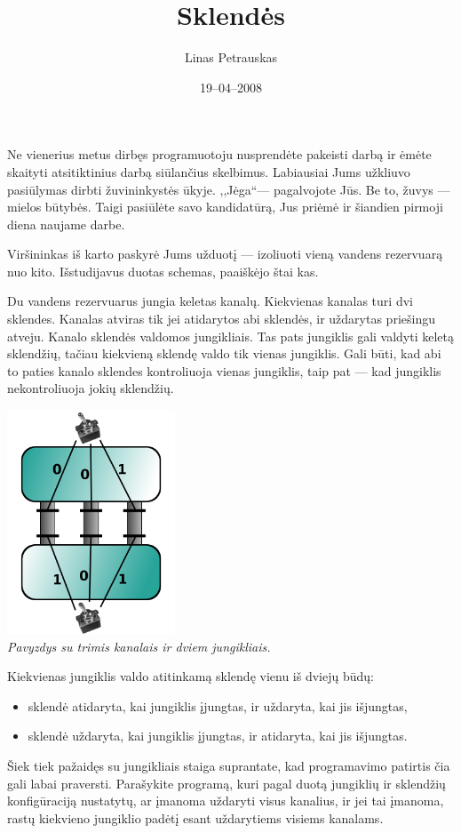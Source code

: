 \documentclass[zad,zawodnik,lt]{sinol}
\title{Sklendės}
\author{Linas Petrauskas}
\date{19--04--2008}
\begin{document}
  \begin{text}%
Ne vienerius metus dirbęs programuotoju nusprendėte pakeisti darbą ir ėmėte skaityti atsitiktinius darbą siūlančius skelbimus.
Labiausiai Jums užkliuvo pasiūlymas dirbti žuvininkystės ūkyje.
,,Jėga``--- pagalvojote Jūs. Be to, žuvys --- mielos būtybės.
Taigi pasiūlėte savo kandidatūrą, Jus priėmė ir šiandien pirmoji diena naujame darbe.
  
Viršininkas iš karto paskyrė Jums užduotį --- izoliuoti vieną vandens rezervuarą nuo kito.
Išstudijavus duotas schemas, paaiškėjo štai kas.
 
Du vandens rezervuarus jungia keletas kanalų.
Kiekvienas kanalas turi dvi sklendes.
Kanalas atviras tik jei atidarytos abi sklendės, ir uždarytas priešingu atveju.
Kanalo sklendės valdomos jungikliais.
Tas pats jungiklis gali valdyti keletą sklendžių, tačiau kiekvieną sklendę valdo tik vienas jungiklis.
Gali būti, kad abi to paties kanalo sklendes kontroliuoja vienas jungiklis, taip pat --- kad jungiklis nekontroliuoja jokių sklendžių.

    \begin{center}
      \includegraphics[width=5cm]{gates}\\
      \textit{Pavyzdys su trimis kanalais ir dviem jungikliais.}
    \end{center}
    Kiekvienas jungiklis valdo atitinkamą sklendę vienu iš dviejų būdų:
    \begin{itemize}
      \item
        sklendė atidaryta, kai jungiklis įjungtas, ir uždaryta, kai jis išjungtas,
      \item
        sklendė uždaryta, kai jungiklis įjungtas, ir atidaryta, kai jis išjungtas.
    \end{itemize}

    Šiek tiek pažaidęs su jungikliais staiga suprantate, kad programavimo patirtis čia gali labai praversti.
    Parašykite programą, kuri pagal duotą jungiklių ir sklendžių konfigūraciją nustatytų, ar įmanoma uždaryti visus kanalius, ir jei tai įmanoma, rastų kiekvieno jungiklio padėtį esant uždarytiems visiems kanalams. 
    

\end{text}
\end{document}
